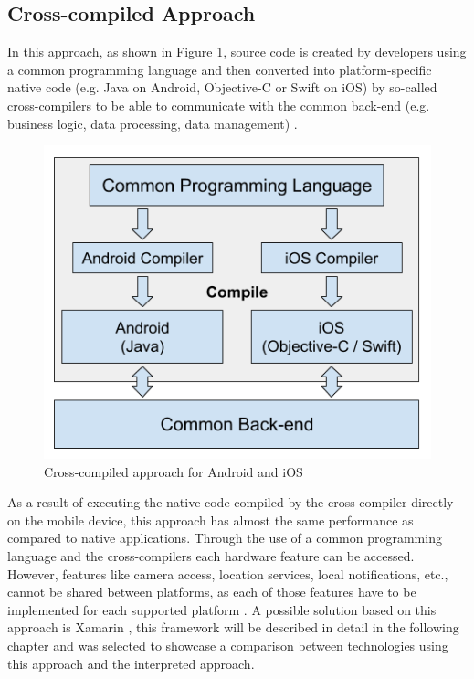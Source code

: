 \documentclass[Bachelor,BIF,english]{twbook}
\begin{document}
\subsection{Cross-compiled Approach}
In this approach, as shown in Figure \ref{Fig1}, source code is created by developers using a common programming language and then converted into platform-specific native code (e.g. Java on Android, Objective-C or Swift on iOS) by so-called cross-compilers to be able to communicate with the common back-end (e.g. business logic, data processing, data management) \cite[p.~3]{7479278} \cite[p.~3]{7934674}.
\begin{figure}[!htbp]
\centering
\includegraphics[width=0.5\linewidth]{PICs/Cross-Compiled.png}
\caption{Cross-compiled approach for Android and iOS \cite[p.~3]{7479278}}\label{Fig1}
\end{figure}
As a result of executing the native code compiled by the cross-compiler directly on the mobile device, this approach has almost the same performance as compared to native applications. Through the use of a common programming language and the cross-compilers each hardware feature can be accessed. However, features like camera access, location services, local notifications, etc., cannot be shared between platforms, as each of those features have to be implemented for each supported platform \cite[p.~627]{6420693} \cite[p.~3-4]{7479278}. A possible solution based on this approach is Xamarin \cite[p.~3]{7934674}, this framework will be described in detail in the following chapter and was selected to showcase a comparison between technologies using this approach and the interpreted approach.
\end{document}
